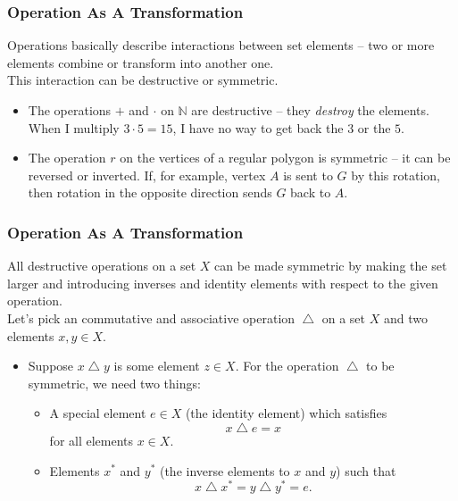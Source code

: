 \documentclass[aspectratio=169,11pt,usenames,dvipsnames,handout]{beamer}
\newcommand{\N}{\mathbb{N}}
\DeclareMathOperator{\tng}{\triangle}
\begin{document}
\begin{frame}
 \frametitle{Operation As A Transformation}
 \alert{Operations} basically describe interactions between set elements -- two
 or more elements combine or \alert{transform} into another one.\pause\\
 This interaction can be \alert{destructive} or \alert{symmetric}.\pause\\
 \begin{itemize}
  \item The operations $+$ and $ \cdot $ on $\N$ are \alert{destructive} -- they
   \emph{destroy} the elements. \pause
  When I multiply $3 \cdot 5 = 15$, I have no way to get back the $3$ or the
  $5$.\pause
 \item The operation $r$ on the vertices of a regular polygon is
  \alert{symmetric} -- it can be reversed or \alert{inverted}. \pause
  If, for example, vertex $A$ is sent to $G$ by this rotation, then rotation in
  the opposite direction sends $G$ back to $A$.
 \end{itemize}
\end{frame}

\begin{frame}
 \frametitle{Operation As A Transformation}
 All destructive operations on a set $X$ \alert{can be made symmetric} by making
 the set larger and introducing \alert{inverses} and \alert{identity elements}
 with respect to the given operation.\pause\\
 Let's pick an commutative and associative operation $\tng$ on a set $X$
 and two elements $x,y
 \in X$.\pause
 \begin{itemize}
  \item Suppose $x \tng y$ is some element $z \in X$. For the operation
   $\tng$ to be \alert{symmetric}, we need two things:\pause
  \begin{itemize}[label=\textemdash]
   \item A special element $e \in X$ (the \alert{identity} element) which
    satisfies
    \[
     x \tng e = x
    \]
    for all elements $x \in X$.\pause
   \item Elements $x^{*}$ and $y^{*}$ (the \alert{inverse} elements to $x$ and
    $y$) such that
    \[
     x \tng x^{*} = y \tng y^{*} = e.
    \]
  \end{itemize}
 \end{itemize}
\end{frame}
\end{document}

